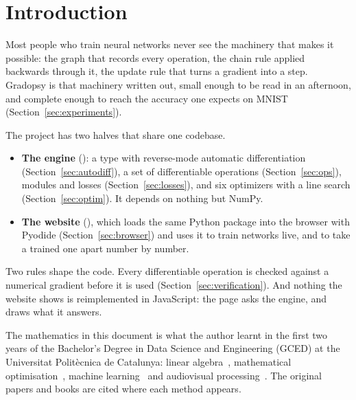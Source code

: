 \section{Introduction}
\label{sec:intro}

Most people who train neural networks never see the machinery that makes it possible: the graph
that records every operation, the chain rule applied backwards through it, the update rule that
turns a gradient into a step. Gradopsy is that machinery written out, small enough to be read in an
afternoon, and complete enough to reach the accuracy one expects on MNIST
(Section~\ref{sec:experiments}).

The project has two halves that share one codebase.
\begin{itemize}
  \item \textbf{The engine} (): a  type with reverse-mode automatic
        differentiation (Section~\ref{sec:autodiff}), a set of differentiable operations
        (Section~\ref{sec:ops}), modules and losses (Section~\ref{sec:losses}), and six optimizers
        with a line search (Section~\ref{sec:optim}). It depends on nothing but NumPy.
  \item \textbf{The website} (), which loads the same Python package into the browser
        with Pyodide (Section~\ref{sec:browser}) and uses it to train networks live, and to take a
        trained one apart number by number.
\end{itemize}

Two rules shape the code. Every differentiable operation is checked against a numerical gradient
before it is used (Section~\ref{sec:verification}). And nothing the website shows is reimplemented
in JavaScript: the page asks the engine, and draws what it answers.

The mathematics in this document is what the author learnt in the first two years of the
Bachelor's Degree in Data Science and Engineering (GCED) at the Universitat Polit\`ecnica de
Catalunya: linear algebra~\cite{upc-alg}, mathematical optimisation~\cite{upc-om}, machine
learning~\cite{upc-aa1} and audiovisual processing~\cite{upc-ipa}. The original papers and books
are cited where each method appears.

